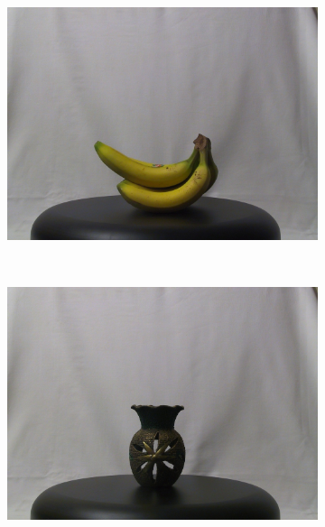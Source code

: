 \documentclass[review]{elsarticle}
\begin{document}
\begin{figure}[htb]
    \centering
    \begin{subfigure}[t]{0.15\columnwidth}
        \centering
        \includegraphics[width=1\columnwidth]{images/3d/1}
    \end{subfigure}%
    ~ %
    \begin{subfigure}[t]{0.15\columnwidth}
        \centering
        \includegraphics[width=1\columnwidth]{images/3d/2}
    \end{subfigure}%
    ~ %
    \begin{subfigure}[t]{0.15\columnwidth}
        \centering

\end{subfigure}
\end{figure}
\end{document}
